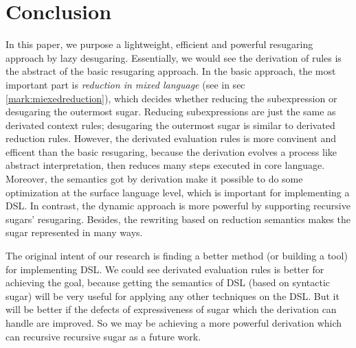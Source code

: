 \section{Conclusion}
\label{sec6}


In this paper, we purpose a lightweight, efficient and powerful resugaring approach by lazy desugaring. Essentially, we would see the derivation of rules is the abstract of the basic resugaring approach. In the basic approach, the most important part is \emph{reduction in mixed language} (see in sec \ref{mark:miexedreduction}), which decides whether reducing the subexpression or desugaring the outermost sugar. Reducing subexpressions are just the same as derivated context rules; desugaring the outermost sugar is similar to derivated reduction rules. However, the derivated evaluation rules is more convinent and efficent than the basic resugaring, because the derivation evolves a process like abstract interpretation\cite{AbstractInterpretation}, then reduces many steps executed in core language. Moreover, the semantics got by derivation make it possible to do some optimization at the surface language level, which is important for implementing a DSL. In contrast, the dynamic approach is more powerful by supporting recursive sugars' resugaring. Besides, the rewriting based on reduction semantics makes the sugar represented in many ways.

The original intent of our research is finding a better method (or building a tool) for implementing DSL. We could see derivated evaluation rules is better for achieving the goal, because getting the semantics of DSL (based on syntactic sugar) will be very useful for applying any other techniques on the DSL. But it will be better if the defects of expressiveness of sugar which the derivation can handle are improved. So we may be achieving a more powerful derivation which can recursive recursive sugar as a future work.
